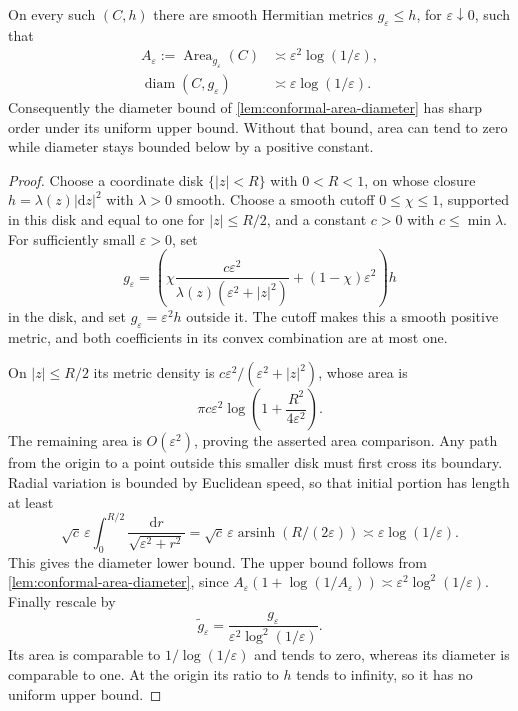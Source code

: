 \begin{example}\label{ex:conformal-log-diameter-sharpness}
On every such $(C,h)$ there are smooth Hermitian metrics $g_\varepsilon\leq h$, for $\varepsilon\downarrow0$, such that
\[
 \begin{aligned}
 A_\varepsilon:=\operatorname{Area}_{g_\varepsilon}(C)
       &\asymp\varepsilon^2\log(1/\varepsilon),\\
 \operatorname{diam}(C,g_\varepsilon)
       &\asymp\varepsilon\log(1/\varepsilon).
 \end{aligned}
\]
Consequently the diameter bound of \cref{lem:conformal-area-diameter} has sharp order under its uniform upper bound. Without that bound, area can tend to zero while diameter stays bounded below by a positive constant.
\end{example}
\begin{proof}
Choose a coordinate disk $\{|z|<R\}$ with $0<R<1$, on whose closure $h=\lambda(z)|\mathrm{d}z|^2$ with $\lambda>0$ smooth. Choose a smooth cutoff $0\leq\chi\leq1$, supported in this disk and equal to one for $|z|\leq R/2$, and a constant $c>0$ with $c\leq\min\lambda$. For sufficiently small $\varepsilon>0$, set
\[
 g_\varepsilon=
 \left(\chi\frac{c\varepsilon^2}{\lambda(z)(\varepsilon^2+|z|^2)}
             +(1-\chi)\varepsilon^2\right)h
\]
in the disk, and set $g_\varepsilon=\varepsilon^2h$ outside it. The cutoff makes this a smooth positive metric, and both coefficients in its convex combination are at most one.

On $|z|\leq R/2$ its metric density is $c\varepsilon^2/(\varepsilon^2+|z|^2)$, whose area is
\[
 \pi c\varepsilon^2
       \log\left(1+\frac{R^2}{4\varepsilon^2}\right).
\]
The remaining area is $O(\varepsilon^2)$, proving the asserted area comparison. Any path from the origin to a point outside this smaller disk must first cross its boundary. Radial variation is bounded by Euclidean speed, so that initial portion has length at least
\[
 \sqrt c\,\varepsilon\int_0^{R/2}
                 \frac{\mathrm{d}r}{\sqrt{\varepsilon^2+r^2}}
       =\sqrt c\,\varepsilon\operatorname{arsinh}(R/(2\varepsilon))
       \asymp\varepsilon\log(1/\varepsilon).
\]
This gives the diameter lower bound. The upper bound follows from \cref{lem:conformal-area-diameter}, since $A_\varepsilon(1+\log(1/A_\varepsilon))\asymp\varepsilon^2\log^2(1/\varepsilon)$. Finally rescale by
\[
 \widetilde g_\varepsilon
       =\frac{g_\varepsilon}{\varepsilon^2\log^2(1/\varepsilon)}.
\]
Its area is comparable to $1/\log(1/\varepsilon)$ and tends to zero, whereas its diameter is comparable to one. At the origin its ratio to $h$ tends to infinity, so it has no uniform upper bound.
\end{proof}

